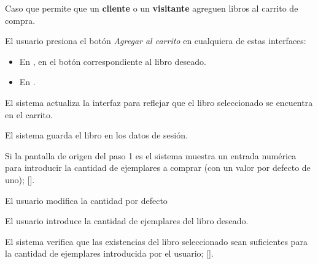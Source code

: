 %
%

{
  Caso que permite que un \textbf{cliente} o un \textbf{visitante} agreguen
  libros al carrito de compra.

  \begin{trayectoriaPrincipal}

    \item El usuario presiona el botón \textit{Agregar al carrito} en
      cualquiera de estas interfaces:
      \begin{itemize}
        \item En , en el botón correspondiente
          al libro deseado.
        \item En .
      \end{itemize}

      \item El sistema actualiza la interfaz para reflejar que el libro
        seleccionado se encuentra en el carrito.

      \item El sistema guarda el libro en los datos de sesión.

      \item Si la pantalla de origen del paso 1 es
         el sistema muestra un entrada
        numérica para introducir la cantidad de ejemplares a comprar (con un
        valor por defecto de uno);
        [].

  \end{trayectoriaPrincipal}


  \begin{trayectoriaAlternativa}
    {El usuario modifica la cantidad por defecto}

    \item El usuario introduce la cantidad de ejemplares del
      libro deseado.

    \item El sistema verifica que las existencias del libro seleccionado
      sean suficientes para la cantidad de ejemplares introducida por el
      usuario; [].


\end{trayectoriaAlternativa}}
